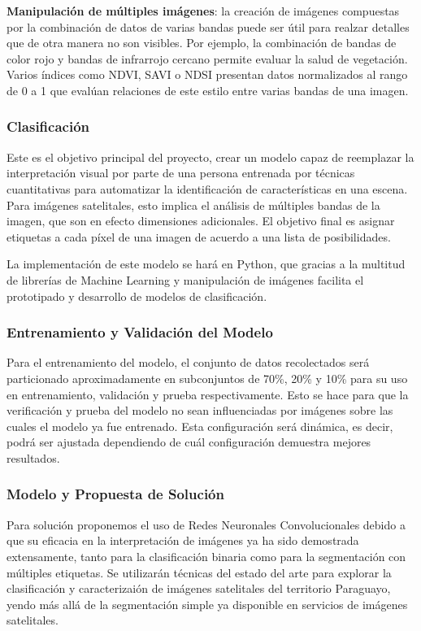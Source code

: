 {\bf Manipulación de múltiples imágenes}: la creación de imágenes compuestas por la combinación de datos de varias
bandas puede ser útil para realzar detalles que de otra manera no son visibles. Por ejemplo, la combinación de bandas
de color rojo y bandas de infrarrojo cercano permite evaluar la salud de vegetación. Varios índices como NDVI, SAVI o
NDSI presentan datos normalizados al rango de 0 a 1 que evalúan relaciones de este estilo entre varias bandas de una
imagen.

\subsubsection{Clasificación}

Este es el objetivo principal del proyecto, crear un modelo capaz de reemplazar la interpretación visual por parte de
una persona entrenada por técnicas cuantitativas para automatizar la identificación de características en una escena.
Para imágenes satelitales, esto implica el análisis de múltiples bandas de la imagen, que son en efecto dimensiones
adicionales. El objetivo final es asignar etiquetas a cada píxel de una imagen de acuerdo a una lista de posibilidades.

La implementación de este modelo se hará en Python, que gracias a la multitud de librerías de Machine Learning y
manipulación de imágenes facilita el prototipado y desarrollo de modelos de clasificación.

\subsubsection{Entrenamiento y Validación del Modelo}

Para el entrenamiento del modelo, el conjunto de datos recolectados será particionado aproximadamente en subconjuntos
de 70\%, 20\% y 10\% para su uso en entrenamiento, validación y prueba respectivamente. Esto se hace para que la
verificación y prueba del modelo no sean influenciadas por imágenes sobre las cuales el modelo ya fue entrenado. Esta
configuración será dinámica, es decir, podrá ser ajustada dependiendo de cuál configuración demuestra mejores
resultados.

\subsubsection{Modelo y Propuesta de Solución}

Para solución proponemos el uso de Redes Neuronales Convolucionales debido a que su eficacia en la interpretación de
imágenes ya ha sido demostrada extensamente, tanto para la clasificación binaria como para la segmentación con
múltiples etiquetas. Se utilizarán técnicas del estado del arte para explorar la clasificación y caracterizaión de
imágenes satelitales del territorio Paraguayo, yendo más allá de la segmentación simple ya disponible en servicios de
imágenes satelitales.

